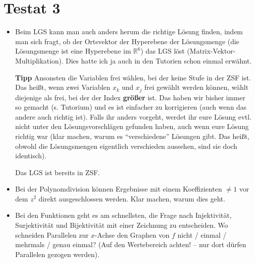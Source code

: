 \documentclass[11pt, a4paper]{article}
\newcommand{\R}{\mathbb{R}}
\begin{document}
\section*{Testat 3}
\begin{itemize}
\item Beim LGS kann man auch anders herum die richtige Lösung finden, indem man sich fragt, ob der Ortsvektor der Hyperebene der Lösungsmenge (die Lösungsmenge ist eine Hyperebene im $\R^6$) das LGS löst (Matrix-Vektor-Multiplikation). Dies hatte ich ja auch in den Tutorien schon einmal erwähnt.

\textbf{Tipp} Ansonsten die Variablen frei wählen, bei der keine Stufe in der ZSF ist. Das heißt, wenn zwei Variablen $x_k$ und $x_j$ frei gewählt werden können, wählt diejenige als frei, bei der der Index \textbf{größer} ist. Das haben wir bisher immer so gemacht (s. Tutorium) und es ist einfacher zu korrigieren (auch wenn das andere auch richtig ist). Falls ihr anders vorgeht, werdet ihr eure Lösung evtl. nicht unter den Lösungsvorschlägen gefunden haben, auch wenn eure Lösung richtig war (klar machen, warum es \enquote{verschiedene} Lösungen gibt. Das heißt, obwohl die Lösungsmengen eigentlich verschieden aussehen, sind sie doch identisch).

Das LGS ist bereits in ZSF. 

\item Bei der Polynomdivision können Ergebnisse mit einem Koeffizienten $\neq 1$ vor dem $z^2$ direkt ausgeschlossen werden. Klar machen, warum dies geht.

\item Bei den Funktionen geht es am schnellsten, die Frage nach Injektivität, Surjektivität und Bijektivität mit einer Zeichnung zu entscheiden. Wo schneiden Parallelen zur $x$-Achse den Graphen von $f$ nicht / einmal / mehrmals / genau einmal? (Auf den Wertebereich achten! -- nur dort dürfen Parallelen gezogen werden).
\end{itemize}














\newpage
\end{document}
